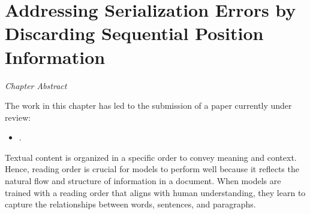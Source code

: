
\chapter{Addressing Serialization Errors by Discarding Sequential Position Information}
\label{chapter:chapter4}

\renewcommand{\leftmark}{\spacedlowsmallcaps{Addressing Serialization Errors by Discarding Sequential Position Information}}

\begin{chapabstract}
    {\em
    Chapter Abstract


    \vspace*{5mm}
    The work in this chapter has led to the submission of a paper currently under review:}
    \begin{itemize}
        \item \small \fullcite{}.
    \end{itemize}
\end{chapabstract}



\newpage

\minitoc
{}

Textual content is organized in a specific order to convey meaning and context. Hence, reading order is crucial for models to perform well because it reflects the natural flow and structure of information in a document. When models are trained with a reading order that aligns with human understanding, they learn to capture the relationships between words, sentences, and paragraphs. 


